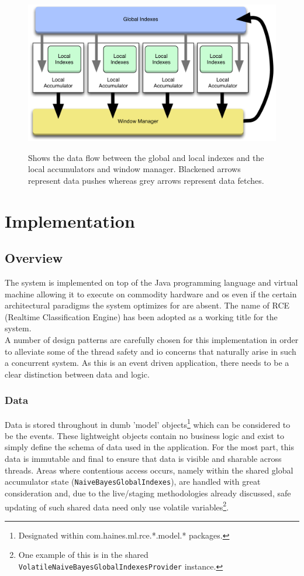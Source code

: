 \documentclass[a4paper,11pt]{scrreprt}
\begin{document}
\begin{figure}[h!]
\centering
\caption{Shows the data flow between the global and local indexes and the local accumulators and window manager. Blackened arrows represent data pushes whereas grey arrows represent data fetches.}
\includegraphics[scale=0.35, trim=0 0 0 12, clip=true] {indexes.pdf}
\label{fig:indexes}
\end{figure}

\chapter{Implementation}
\VerbatimFootnotes
\section{Overview}
The system is implemented on top of the Java programming language and virtual machine allowing it to execute on commodity hardware and \acrshort{os} even if the certain architectural paradigms the system optimizes for are absent. The name of RCE (Realtime Classification Engine) has been adopted as a working title for the system. \\A number of design patterns are carefully chosen for this implementation in order to alleviate some of the thread safety and \acrshort{io} concerns that naturally arise in such a concurrent system. As this is an event driven application, there needs to be a clear distinction between data and logic. 
\subsection{Data}
Data is stored throughout in dumb 'model' objects\footnote{Designated within com.haines.ml.rce.*.model.* packages.} which can be considered to be the events. These lightweight objects contain no business logic and exist to simply define the schema of data used in the application. For the most part, this data is immutable and final to ensure that data is visible and sharable across threads. Areas where contentious access occurs, namely within the shared global accumulator state (\verb|NaiveBayesGlobalIndexes|), are handled with great consideration and, due to the live/staging methodologies already discussed, safe updating of such shared data need only use volatile variables\footnote{One example of this is in the shared \verb|VolatileNaiveBayesGlobalIndexesProvider| instance.}. 
\end{document}
